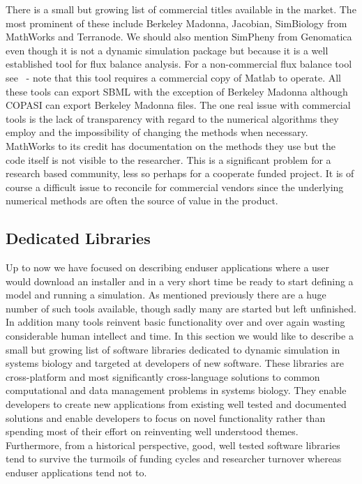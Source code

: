 \documentclass[12pt]{article}
\begin{document}
There is a small but growing list of commercial titles available in the market. The most prominent of these include Berkeley Madonna, Jacobian, SimBiology from MathWorks and Terranode. We should also mention SimPheny from Genomatica even though it is not a dynamic simulation package but because it is a well established tool for flux balance analysis. For a non-commercial flux balance tool see~\citep{Klamt:2007} - note that this tool requires a commercial copy of Matlab to operate. All these tools can export SBML with the exception of Berkeley Madonna although COPASI can export Berkeley Madonna files. The one real issue with commercial tools is the lack of transparency with regard to the numerical algorithms they employ and the impossibility of changing the methods when necessary. MathWorks to its credit has documentation on the methods they use but the code itself is not visible to the researcher. This is a significant problem for a research based community, less so perhaps for a cooperate funded project. It is of course a difficult issue to reconcile for commercial vendors since the underlying numerical methods are often the source of value in the product.

\subsection{Dedicated Libraries}

Up to now we have focused on describing enduser applications where a user would download an installer and in a very short time be ready to start defining a model and running a simulation. As mentioned previously there are a huge number of such tools available, though sadly many are started but left unfinished. In addition many tools reinvent basic functionality over and over again wasting considerable human intellect and time. In this section we would like to describe a small but growing list of software libraries dedicated to dynamic simulation in systems biology and targeted at developers of new software. These libraries are cross-platform and most significantly cross-language solutions to common computational and data management problems in systems biology. They enable developers to create new applications from existing well tested and documented solutions and enable developers to focus on novel functionality rather than spending most of their effort on reinventing well understood themes. Furthermore, from a historical perspective, good, well tested software libraries tend to survive the turmoils of funding cycles and researcher turnover whereas enduser applications tend not to.
\end{document}
